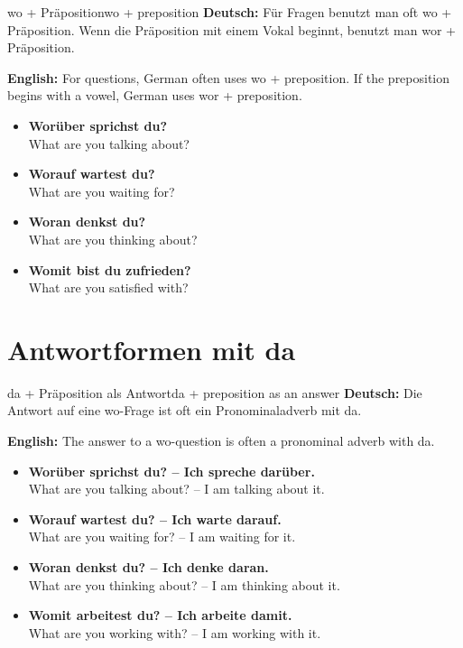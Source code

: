 \documentclass[a4paper,11pt]{article}
\newcommand{\GermanText}[1]{\textbf{Deutsch: }#1\par}
\newcommand{\EnglishText}[1]{{\small\color{SoftGray}\textbf{English: }#1\par}}
\newcommand{\ExampleItem}[2]{\item \textbf{#1}\\{\small\color{SoftGray}#2}}
\begin{document}
        \begin{grammarentry}{wo + Präposition}{wo + preposition}
            \GermanText{Für Fragen benutzt man oft wo + Präposition. Wenn die Präposition mit einem Vokal beginnt, benutzt man wor + Präposition.}
            \EnglishText{For questions, German often uses wo + preposition. If the preposition begins with a vowel, German uses wor + preposition.}
            
            \begin{exbox}
                \begin{itemize}
                    \ExampleItem{Worüber sprichst du?}{What are you talking about?}
                    \ExampleItem{Worauf wartest du?}{What are you waiting for?}
                    \ExampleItem{Woran denkst du?}{What are you thinking about?}
                    \ExampleItem{Womit bist du zufrieden?}{What are you satisfied with?}
                \end{itemize}
            \end{exbox}
        \end{grammarentry}
    
    
    \section{Antwortformen mit da}
        
        \begin{grammarentry}{da + Präposition als Antwort}{da + preposition as an answer}
            \GermanText{Die Antwort auf eine wo-Frage ist oft ein Pronominaladverb mit da.}
            \EnglishText{The answer to a wo-question is often a pronominal adverb with da.}
            
            \begin{exbox}
                \begin{itemize}
                    \ExampleItem{Worüber sprichst du? -- Ich spreche darüber.}{What are you talking about? -- I am talking about it.}
                    \ExampleItem{Worauf wartest du? -- Ich warte darauf.}{What are you waiting for? -- I am waiting for it.}
                    \ExampleItem{Woran denkst du? -- Ich denke daran.}{What are you thinking about? -- I am thinking about it.}
                    \ExampleItem{Womit arbeitest du? -- Ich arbeite damit.}{What are you working with? -- I am working with it.}
                \end{itemize}
            \end{exbox}
        \end{grammarentry}
    
\end{document}
